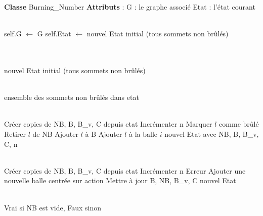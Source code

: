 \documentclass[11pt,a4paper]{article}
\begin{document}
\begin{tcolorbox}[title=Structure de la classe Burning\_Number,colback=green!10!white,colframe=green!95!black]
\begin{algorithm}[H]
\begin{algorithmic}[1]
    \State \textbf{Classe} Burning\_Number
    \State \textbf{Attributs} :
    \State \hspace{1em} G : le graphe associé
    \State \hspace{1em} Etat : l'état courant

    \\

        \State self.G $\gets$ G
        \State self.Etat $\gets$ nouvel Etat initial (tous sommets non brûlés)
    \EndProcedure

    \\
    \\

        \State \Return nouvel Etat initial (tous sommets non brûlés)
    \EndFunction

    \\

        \State \Return ensemble des sommets non brûlés dans etat
    \EndFunction

    \\

        \State Créer copies de NB, B, B\_v, C depuis etat
        \State Incrémenter n
                        \State Marquer $l$ comme brûlé
                        \State Retirer $l$ de NB
                        \State Ajouter $l$ à B
                        \State Ajouter $l$ à la balle $i$
                    \EndIf
                \EndFor
            \EndFor
        \EndFor
        \State \Return nouvel Etat avec NB, B, B\_v, C, n
    \EndFunction
    
    \\

        \State Créer copies de NB, B, B\_v, C depuis etat
        \State Incrémenter n
            \State Erreur
        \EndIf
        \State Ajouter une nouvelle balle centrée sur action
        \State Mettre à jour B, NB, B\_v, C
        \State \Return nouvel Etat
    \EndFunction

    \\

        \State \Return Vrai si NB est vide, Faux sinon
    \EndFunction

\end{algorithmic}
\end{algorithm}

\end{tcolorbox}
\end{document}
